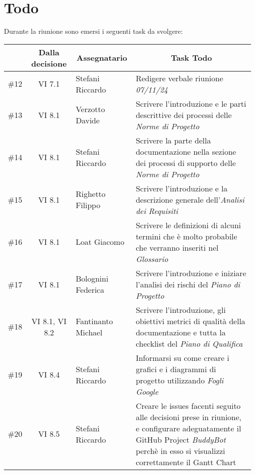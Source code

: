

\section{Todo}

Durante la riunione sono emersi i seguenti task da svolgere:

\vspace{0.5cm}

\begin{table}[htbp]
\centering
{}
\begin{tabular}{|c|c|p{}|p{}|}
    \hline
    \rowcolor[gray]{0.75}
    \multicolumn{1}{|c|}{\textbf{Codice}} & \multicolumn{1}{|c|}{\textbf{Dalla decisione}} & \multicolumn{1}{|c|}{\textbf{Assegnatario}} & \multicolumn{1}{|c|}{\textbf{Task Todo}} \\
    \hline
    \#12 & VI 7.1 & Stefani Riccardo & Redigere verbale riunione \emph{07/11/24} \\
    \hline
    \#13 & VI 8.1 & Verzotto Davide & Scrivere l'introduzione e le parti descrittive dei processi delle \emph{Norme di Progetto} \\
    \hline
    \#14 & VI 8.1 & Stefani Riccardo & Scrivere la parte della documentazione nella sezione dei processi di supporto delle \emph{Norme di Progetto} \\
    \hline
    \#15 & VI 8.1 & Righetto Filippo & Scrivere l'introduzione e la descrizione generale dell'\emph{Analisi dei Requisiti} \\
    \hline
    \#16 & VI 8.1 & Loat Giacomo & Scrivere le definizioni di alcuni termini che è molto probabile che verranno inseriti nel \emph{Glossario} \\
    \hline
    \#17 & VI 8.1 & Bolognini Federica & Scrivere l'introduzione e iniziare l'analisi dei rischi del \emph{Piano di Progetto} \\
    \hline
    \#18 & VI 8.1, VI 8.2 & Fantinanto Michael & Scrivere l'introduzione, gli obiettivi metrici di qualità della documentazione e tutta
    la checklist del \emph{Piano di Qualifica} \\
    \hline
    \#19 & VI 8.4 & Stefani Riccardo & Informarsi su come creare i grafici e i diagrammi di progetto utilizzando \emph{Fogli Google} \\
    \hline
    \#20 & VI 8.5 & Stefani Riccardo & Creare le issues facenti seguito alle decisioni prese in riunione, e configurare adeguatamente il 
    GitHub Project \emph{BuddyBot} perchè in esso si visualizzi correttamente il Gantt Chart \\
    \hline
\end{tabular}
\end{table}
